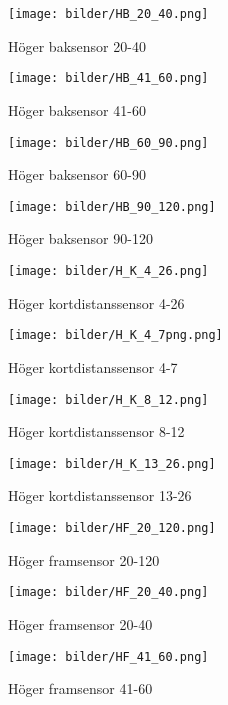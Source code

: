 \begin{figure}[H]
  \centering
 \texttt{[image: bilder/HB\_20\_40.png]}
  \caption{Höger baksensor 20-40}
\end{figure}

\begin{figure}[H]
  \centering
 \texttt{[image: bilder/HB\_41\_60.png]}
  \caption{Höger baksensor 41-60}
\end{figure}

\begin{figure}[H]
  \centering
 \texttt{[image: bilder/HB\_60\_90.png]}
  \caption{Höger baksensor 60-90}
\end{figure}

\begin{figure}[H]
  \centering
 \texttt{[image: bilder/HB\_90\_120.png]}
  \caption{Höger baksensor 90-120}
\end{figure}

\begin{figure}[H]
  \centering
 \texttt{[image: bilder/H\_K\_4\_26.png]}
  \caption{Höger kortdistanssensor 4-26}
\end{figure}

\begin{figure}[H]
  \centering
 \texttt{[image: bilder/H\_K\_4\_7png.png]}
  \caption{Höger kortdistanssensor 4-7}
\end{figure}

\begin{figure}[H]
  \centering
 \texttt{[image: bilder/H\_K\_8\_12.png]}
  \caption{Höger kortdistanssensor 8-12}
\end{figure}

\begin{figure}[H]
  \centering
 \texttt{[image: bilder/H\_K\_13\_26.png]}
  \caption{Höger kortdistanssensor 13-26}
\end{figure}

\begin{figure}[H]
  \centering
 \texttt{[image: bilder/HF\_20\_120.png]}
  \caption{Höger framsensor 20-120}
\end{figure}

\begin{figure}[H]
  \centering
 \texttt{[image: bilder/HF\_20\_40.png]}
  \caption{Höger framsensor 20-40}
\end{figure}

\begin{figure}[H]
  \centering
 \texttt{[image: bilder/HF\_41\_60.png]}
  \caption{Höger framsensor 41-60}
\end{figure}

